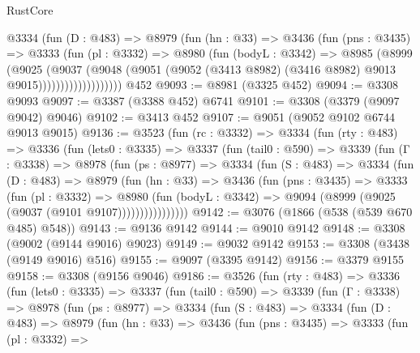 \begin{lexlean}{RustCore}
\begin{coremodule}
                  @3334
                    (fun (D : @483) =>
                    @8979
                      (fun (hn : @33) =>
                      @3436
                        (fun (pns : @3435) =>
                        @3333
                          (fun (pl : @3332) =>
                          @8980
                            (fun (bodyL : @3342) =>
                            @8985
                              (@8999
                                (@9025
                                  (@9037
                                    (@9048
                                      (@9051
                                        (@9052
                                          (@3413 @8982)
                                          (@3416 @8982)
                                          @9013
                                          @9015)))))))))))))))))))
    @452
@9093 := @8981 (@3325 @452)
@9094 := @3308 @9093
@9097 := @3387 (@3388 @452) @6741
@9101 := @3308 (@3379 (@9097 @9042) @9046)
@9102 := @3413 @452
@9107 := @9051 (@9052 @9102 @6744 @9013 @9015)
@9136 := @3523
    (fun (rc : @3332) =>
    @3334
      (fun (rty : @483) =>
      @3336
        (fun (lets0 : @3335) =>
        @3337
          (fun (tail0 : @590) =>
          @3339
            (fun (Γ : @3338) =>
            @8978
              (fun (ps : @8977) =>
              @3334
                (fun (S : @483) =>
                @3334
                  (fun (D : @483) =>
                  @8979
                    (fun (hn : @33) =>
                    @3436
                      (fun (pns : @3435) =>
                      @3333
                        (fun (pl : @3332) =>
                        @8980
                          (fun (bodyL : @3342) =>
                          @9094 (@8999 (@9025 (@9037 (@9101 @9107))))))))))))))))
@9142 := @3076 (@1866 (@538 (@539 @670 @485) @548))
@9143 := @9136 @9142
@9144 := @9010 @9142
@9148 := @3308 (@9002 (@9144 @9016) @9023)
@9149 := @9032 @9142
@9153 := @3308 (@3438 (@9149 @9016) @516)
@9155 := @9097 (@3395 @9142)
@9156 := @3379 @9155
@9158 := @3308 (@9156 @9046)
@9186 := @3526
    (fun (rty : @483) =>
    @3336
      (fun (lets0 : @3335) =>
      @3337
        (fun (tail0 : @590) =>
        @3339
          (fun (Γ : @3338) =>
          @8978
            (fun (ps : @8977) =>
            @3334
              (fun (S : @483) =>
              @3334
                (fun (D : @483) =>
                @8979
                  (fun (hn : @33) =>
                  @3436
                    (fun (pns : @3435) =>
                    @3333
                      (fun (pl : @3332) =>

\end{coremodule}
\end{lexlean}
